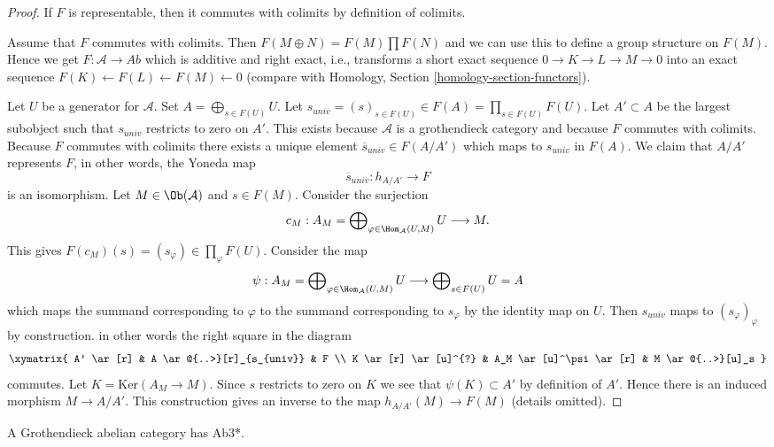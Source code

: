 \begin{proof}
If $F$ is representable, then it commutes with colimits by definition
of colimits.

\medskip\noindent
Assume that $F$ commutes with colimits. Then $F(M \oplus N) = F(M) \prod F(N)$
and we can use this to define a group structure on $F(M)$. Hence we get
$F : \mathcal{A} \to \textit{Ab}$ which is additive and right exact, i.e.,
transforms a short exact sequence $0 \to K \to L \to M \to 0$ into an exact
sequence $F(K) \leftarrow F(L) \leftarrow F(M) \leftarrow 0$ (compare with
Homology, Section \ref{homology-section-functors}).

\medskip\noindent
Let $U$ be a generator for $\mathcal{A}$. Set $A = \bigoplus_{s \in F(U)} U$.
Let $s_{univ} = (s)_{s \in F(U)} \in F(A) = \prod_{s \in F(U)} F(U)$. Let
$A' \subset A$ be the largest subobject such that $s_{univ}$ restricts to
zero on $A'$. This exists because $\mathcal{A}$ is a grothendieck category
and because $F$ commutes with colimits. Because $F$ commutes with colimits
there exists a unique element $\overline{s}_{univ} \in F(A/A')$ which
maps to $s_{univ}$ in $F(A)$. We claim that $A/A'$ represents $F$, in
other words, the Yoneda map
$$
\overline{s}_{univ} : h_{A/A'} \longrightarrow F
$$
is an isomorphism. Let $M \in \Ob(\mathcal{A})$ and $s \in F(M)$. Consider
the surjection
$$
c_M :
A_M = \bigoplus\nolimits_{\varphi \in \Hom_\mathcal{A}(U, M)} U
\longrightarrow
M.
$$
This gives $F(c_M)(s) = (s_\varphi) \in \prod_\varphi F(U)$.
Consider the map
$$
\psi :
A_M = \bigoplus\nolimits_{\varphi \in \Hom_\mathcal{A}(U, M)} U
\longrightarrow
\bigoplus\nolimits_{s \in F(U)} U = A
$$
which maps the summand corresponding to $\varphi$ to the summand
corresponding to $s_\varphi$ by the identity map on $U$. Then $s_{univ}$
maps to $(s_\varphi)_\varphi$ by construction.
in other words the right square in the diagram
$$
\xymatrix{
A' \ar[r] &
A \ar@{..>}[r]_{s_{univ}} & F \\
K \ar[r] \ar[u]^{?} & A_M \ar[u]^\psi \ar[r] &
M \ar@{..>}[u]_s
}
$$
commutes. Let $K = \text{Ker}(A_M \to M)$. Since $s$ restricts to zero
on $K$ we see that $\psi(K) \subset A'$ by definition of $A'$. Hence there
is an induced morphism $M \to A/A'$. This construction gives an inverse
to the map $h_{A/A'}(M) \to F(M)$ (details omitted).
\end{proof}

\begin{lemma}
\label{lemma-grothendieck-products}
A Grothendieck abelian category has Ab3*.
\end{lemma}


